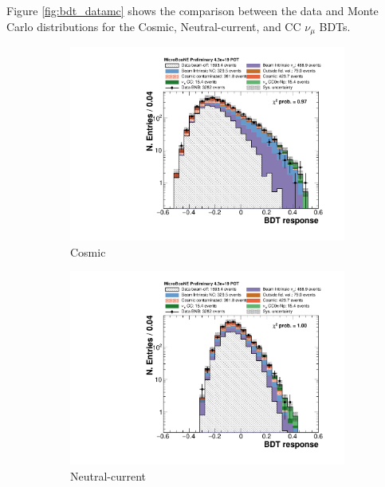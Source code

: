 Figure \ref{fig:bdt_datamc} shows the comparison between the data and Monte Carlo distributions for the Cosmic, Neutral-current, and CC $\nu_{\mu}$ BDTs. 

\begin{figure}[htbp]
\centering
  \begin{subfigure}{0.32\textwidth}
    \includegraphics[width=\linewidth]{figures/bdt_cosmic.pdf}
    \caption{Cosmic} 
  \end{subfigure}\begin{subfigure}{0.32\textwidth}
    \includegraphics[width=\linewidth]{figures/bdt_nc.pdf}
    \caption{Neutral-current}
  \end{subfigure}\begin{subfigure}{0.32\textwidth}

\end{subfigure}
\end{figure}
